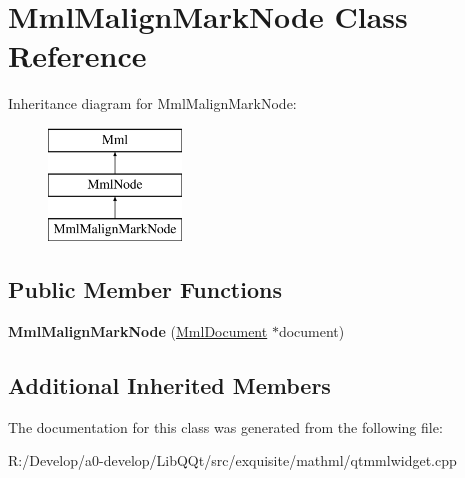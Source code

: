 \hypertarget{class_mml_malign_mark_node}{}\section{Mml\+Malign\+Mark\+Node Class Reference}
\label{class_mml_malign_mark_node}
Inheritance diagram for Mml\+Malign\+Mark\+Node\+:\begin{figure}[H]
\begin{center}
\leavevmode
\includegraphics[height=3.000000cm]{class_mml_malign_mark_node}
\end{center}
\end{figure}
\subsection*{Public Member Functions}
\begin{DoxyCompactItemize}
\item 
\mbox{\label{class_mml_malign_mark_node_a83fa615836c1f6ef699e7e15bfc333e3}} 
{\bfseries Mml\+Malign\+Mark\+Node} (\mbox{\hyperlink{class_mml_document}{Mml\+Document}} $\ast$document)
\end{DoxyCompactItemize}
\subsection*{Additional Inherited Members}


The documentation for this class was generated from the following file\+:\begin{DoxyCompactItemize}
\item 
R\+:/\+Develop/a0-\/develop/\+Lib\+Q\+Qt/src/exquisite/mathml/qtmmlwidget.\+cpp\end{DoxyCompactItemize}
